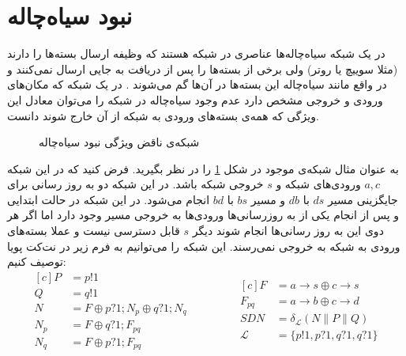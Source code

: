 \documentclass[
msc,
irfonts
]{./tex/tehran-thesis}
\newcommand{\پ}{پروژه/پایان‌نامه/رساله }
\theoremstyle{definition}
\theoremstyle{theorem}
\theoremstyle{definition}
\numberwithin{algorithm}{chapter}
\newcommand{\s}[1]{\{#1\}}
\newcommand{\ra}{\rightarrow}
\newcommand{\lf}[1]{\LTRfootnote{#1}}
\begin{document}
\section{نبود سیاه‌چاله}
در یک شبکه سیاه‌چاله‌ها\lf{Blackhole}
عناصری در شبکه هستند که وظیفه ارسال بسته‌ها را دارند
(مثلا سوییچ‌ یا روتر)
ولی برخی از بسته‌ها را پس از دریافت به جایی ارسال نمی‌کنند و در واقع مانند سیاه‌چاله این بسته‌ها در آن‌ها گم می‌شوند
\cite{network-abstractions}.
در یک شبکه که مکان‌های ورودی و خروجی مشخص دارد عدم وجود سیاه‌چاله در شبکه را می‌توان معادل این ويژگی که همه‌ی بسته‌های ورودی به شبکه از آن خارج شوند دانست.
\begin{figure}
    \centering
    \caption{ 
        شبکه‌ی ناقض ویژگی نبود سیاه‌چاله
    }
    \label{fig:blackhole}
\end{figure}
به عنوان مثال شبکه‌ی موجود در شکل
\ref{fig:blackhole}
را در نظر بگیرید.
فرض کنید که در این شبکه
$a,c$
ورودی‌های شبکه و
$s$
خروجی شبکه باشد.
در این شبکه دو به روز رسانی برای جایگزینی
مسیر
$ds$
با
$db$
و مسیر
$bs$
با
$bd$
انجام می‌شود.
در این شبکه در حالت ابتدایی و پس از انجام یکی از به روز‌رسانی‌ها ورودی‌ها به خروجی مسیر وجود دارد اما اگر هر دوی این به روز رسانی‌ها انجام شوند دیگر
$s$
قابل دسترسی نیست و عملا بسته‌های ورودی به شبکه به خروجی نمی‌رسند.
این شبکه را می‌توانیم به فرم زیر در نت‌کت پویا توصیف کنیم:
\begin{equation*}
    \begin{aligned}[c]
        P   & = p!1                             \\
        Q   & = q!1                             \\
        N   & = F \oplus p?1;N_p \oplus q?1;N_q \\
        N_p & = F \oplus q?1;F_{pq}             \\
        N_q & = F \oplus p?1;F_{pq}
    \end{aligned}
    \qquad\qquad
    \begin{aligned}[c]
        F           & = a\ra s \oplus c\ra s            \\
        F_{pq}      & = a\ra b \oplus c\ra d            \\
        SDN         & = \delta_{\mathcal{L}} (N
        \parallel P \parallel Q)                \\
        \mathcal{L} & = \s{p!1,p?1,q?1,q?1}
    \end{aligned}
\end{equation*}
\end{document}
